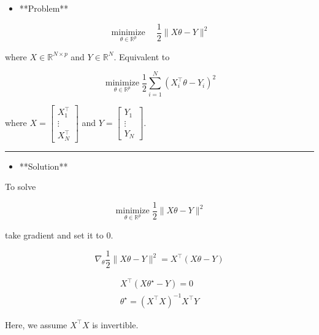 \documentclass{report}
\begin{document}
\begin{example}
    \begin{itemize}
        \item **Problem**
    \end{itemize}

    $$
    \underset{\theta \in \mathbb{R}^{p}}{\operatorname{minimize}} \quad \frac{1}{2}\|X \theta-Y\|^{2}
    $$

    where $X \in \mathbb{R}^{N \times p}$ and $Y \in \mathbb{R}^{N}$. Equivalent to

    $$
    \underset{\theta \in \mathbb{R}^{p}}{\operatorname{minimize}} \frac{1}{2} \sum_{i=1}^{N}\left(X_{i}^{\top} \theta-Y_{i}\right)^{2}
    $$

    where $X=\left[\begin{array}{c}X_{1}^{\top} \\ \vdots \\ X_{N}^{\top}\end{array}\right]$ and $Y=\left[\begin{array}{c}Y_{1} \\ \vdots \\ Y_{N}\end{array}\right]$.

    \hrule

    \begin{itemize}
        \item **Solution**
    \end{itemize}

    To solve

    $$
    \underset{\theta \in \mathbb{R}^{p}}{\operatorname{minimize}} \frac{1}{2}\|X \theta-Y\|^{2}
    $$

    take gradient and set it to $0$.

    $$
    \nabla_{\theta} \frac{1}{2}\|X \theta-Y\|^{2}=X^{\top}(X \theta-Y)
    $$

    $$
    \begin{gathered}
    X^{\top}\left(X \theta^{\star}-Y\right)=0 \\
    \theta^{\star}=\left(X^{\top} X\right)^{-1} X^{\top} Y
    \end{gathered}
    $$

    Here, we assume $X^{\top} X$ is invertible.
\end{example}
\end{document}
